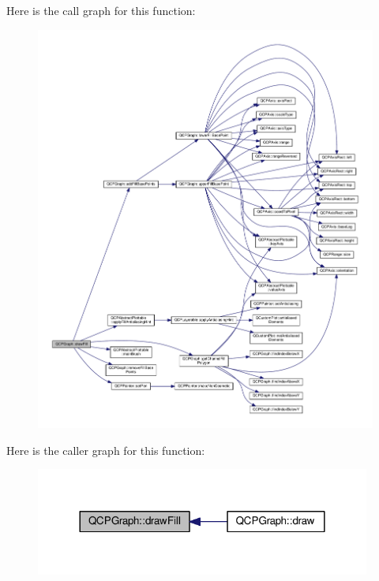 Here is the call graph for this function\+:\nopagebreak
\begin{figure}[H]
\begin{center}
\leavevmode
\includegraphics[width=350pt]{class_q_c_p_graph_ad6d07926e6d6b7cfa70258780d47b7a0_cgraph}
\end{center}
\end{figure}




Here is the caller graph for this function\+:\nopagebreak
\begin{figure}[H]
\begin{center}
\leavevmode
\includegraphics[width=312pt]{class_q_c_p_graph_ad6d07926e6d6b7cfa70258780d47b7a0_icgraph}
\end{center}
\end{figure}


\hypertarget{class_q_c_p_graph_abc01180629621f1e47e94559227d3d8c}{}
